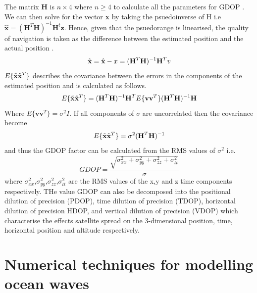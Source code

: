 The matrix \textbf{H} is $n\times4$ where $n \geq 4$ to calculate all the parameters for GDOP \cite{jwo2001efficient}. We can then solve for the vector \textbf{x} by taking the psuedoinverse of H i.e $\hat{\textbf{x}} = (\textbf{H}^T\textbf{H})^{-1}\textbf{H}^t\textbf{z}$. Hence, given that the psuedorange is linearised, the quality of navigation is taken as the difference between the estimated position and the actual position \cite{jwo2001efficient}.
\begin{equation}
	\Tilde{\textbf{x}} = \hat{\textbf{x}} - x = (\textbf{H}^T\textbf{H})^{-1}\textbf{H}^Tv
\end{equation}
$E\{\Tilde{\textbf{x}}\Tilde{\textbf{x}}^T\}$ describes the covariance between the errors in the components of the estimated position \cite{jwo2001efficient} and is calculated as follows. 
\begin{equation}
	E\{\Tilde{\textbf{x}}\Tilde{\textbf{x}}^T\} = (\textbf{H}^T\textbf{H})^{-1}\textbf{H}^TE\{\textbf{vv}^T\} (\textbf{H}^T\textbf{H})^{-1}\textbf{H}
\end{equation}
Where $E\{\textbf{vv}^T\} = \sigma^2 I$. If all components of $\sigma$ are uncorrelated then the covariance become
\begin{equation}
	E\{\Tilde{\textbf{x}}\Tilde{\textbf{x}}^T\} = \sigma^2(\textbf{H}^T\textbf{H})^{-1}
\end{equation}
and thus the GDOP factor can be calculated from the RMS values of $\sigma^2$ i.e.
\begin{equation}
	GDOP = \frac{\sqrt{\sigma_{xx}^2+\sigma_{yy}^2+ \sigma_{zz}^2+\sigma_{tt}^2}}{\sigma}
\end{equation} where $\sigma_{xx}^2$,$\sigma_{yy}^2$,$\sigma_{zz}^2$,$\sigma_{tt}^2$ are the RMS values of the x,y and z time components respectively. THe value GDOP can also be decomposed into the positional dilution of precision (PDOP), time dilution of precision (TDOP), horizontal dilution of precision HDOP, and vertical dilution of precision (VDOP) which characterise the effects satellite spread on the 3-dimensional position, time, horizontal position and altitude respectively.\par

\section{Numerical techniques for modelling ocean waves}

